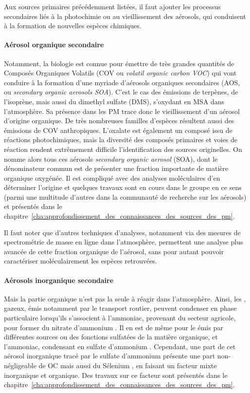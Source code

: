Aux sources primaires précédemment listées, il faut ajouter les processus secondaires liés
à la photochimie ou au vieillissement des aérosols, qui conduisent à la formation de
nouvelles espèces chimiques.

\paragraph{Aérosol organique secondaire}%
\label{par:aérosol_organique_secondaire}

Notamment, la biologie est connue pour émettre de très grandes quantités de Composés
Organiques Volatils (COV ou \textit{volatil organic carbon VOC}) qui vont conduire à la
formation d'une myriade d'aérosols organiques secondaires (AOS, ou \textit{secondary
organic aerosols SOA}). C'est le cas des émissions de terpènes, de l'isoprène,
mais aussi du dimethyl sulfate (DMS), s'oxydant en
MSA dans l'atmosphère. Sa présence dans les PM trace donc le vieillissement d'un aérosol
d'origine organique. De très nombreuses familles d'espèces résultent aussi des émissions
de COV anthropiques.  
L'oxalate est également un composé issu de réactions photochimiques,
mais la diversité des composés primaires et voies de réaction rendent extrêmement difficile
l'identification des sources originelles.
On nomme alors tous ces aérosols \textit{secondary organic aerosol} (SOA), dont le
dénominateur commun est de présenter une fraction importante de matière organique
oxygénée. Il est compliqué avec des analyses moléculaires d'en déterminer l'origine et
quelques travaux sont en cours dans le groupe en ce sens (parmi une multitude d'autres
dans la communauté de recherche sur les aérosols) et présentés dans le
chapitre~\ref{cha:approfondissement_des_connaissances_des_sources_des_pm}.

Il faut noter que d'autres techniques d'analyses, notamment via des mesures de
spectrométrie de masse en ligne dans l'atmosphère, permettent une
analyse plus avancée de cette fraction organique de l'aérosol, sans pour autant pouvoir
caractériser moléculairement les espèces retrouvées.

\paragraph{Aérosols inorganique secondaire}%
\label{par:aérosols_inorganique_secondaire}

Mais la partie organique n'est pas la seule à réagir dans l'atmosphère. Ainsi, les
, gazeux, émis notamment par le transport routier, peuvent condenser en phase
particulaire lorsqu'ils s'associent à l'ammoniac, provenant du secteur agricole, pour
former du nitrate d'ammonium . Il en est de même pour le  émis par
différentes sources ou des fonctions sulfatées de la matière organique, et l'ammoniac,
condensant en sulfate d'ammonium . Cependant, une part de cet aérosol
inorganique tracé par le sulfate d'ammonium présente une part non-négligeable de OC mais
aussi du Sélenium , en faisant un facteur mixte inorganique et organique. Des travaux
sur ce facteur sont présentés dans le
chapitre~\ref{cha:approfondissement_des_connaissances_des_sources_des_pm}.


